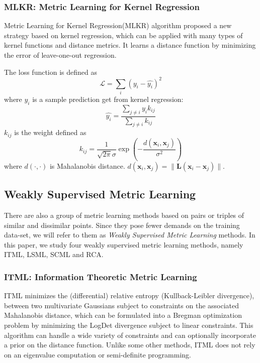 \subsubsection{MLKR: Metric Learning for Kernel Regression}
    
    
         Metric Learning for Kernel Regression(MLKR)\cite{MLKR} algorithm proposed a new strategy based on kernel regression, which can be applied with many types of kernel functions and distance metrics. It learns a distance function by minimizing the error of leave-one-out regression.
         
         The loss function is defined as
         $$
            \mathcal{L} = \sum_i (y_i - \hat{y_i})^2
         $$
         where $\hat{y_i}$ is a sample prediction get from kernel regression:
         $$
            \hat{y_i} = \frac{\sum_{j \neq i} y_i k_{ij}}{\sum_{j \neq i} k_{ij}}
         $$
         $k_{ij}$ is the weight defined as
         $$
            k_{ij} = \frac{1}{\sqrt{2 \pi} \sigma} \exp \left ( -\frac{d(\mathbf{x}_i, \mathbf{x}_j)}{\sigma^2}\right)
         $$
         where $d(\cdot, \cdot)$ is Mahalanobis distance. $d(\mathbf{x}_i, \mathbf{x}_j) = \| \mathbf{L} (\mathbf{x}_i - \mathbf{x}_j)  \|$.



\subsection{Weakly Supervised Metric Learning}

\label{weaksupervised}
There are also a group of metric learning methods based on pairs or triples of similar and dissimilar points. Since they pose fewer demands on the training data-set, we will refer to them as \emph{Weakly Supervised Metric Learning} methods. In this paper, we study four weakly supervised metric learning methods, namely ITML, LSML, SCML and RCA.




\subsubsection{ITML: Information Theoretic Metric Learning}

ITML\cite{ITML} minimizes the (differential) relative entropy (Kullback-Leibler divergence), between two multivariate Gaussians subject to constraints on the associated Mahalanobis distance, which can be formulated into a Bregman optimization problem by minimizing the LogDet divergence subject to linear constraints. This algorithm can handle a wide variety of constraints and can optionally incorporate a prior on the distance function. Unlike some other methods, ITML does not rely on an eigenvalue computation or semi-definite programming.

